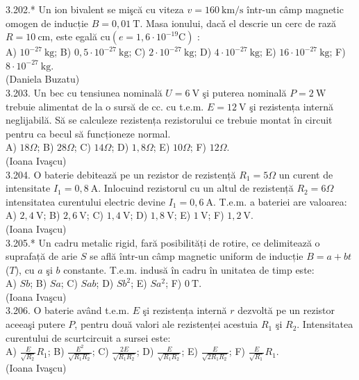 3.202.* Un ion bivalent se mişcă cu viteza $v=160 \mathrm{~km} / \mathrm{s}$ într-un câmp magnetic omogen de inducție $B=0,01 \mathrm{~T}$. Masa ionului, dacǎ el descrie un cerc de rază $R=10 \mathrm{~cm}$, este egală $\mathrm{cu}\left(e=1,6 \cdot 10^{-19} \mathrm{C}\right)$ :\\ A) $10^{-27} \mathrm{~kg}$; B) $0,5 \cdot 10^{-27} \mathrm{~kg}$; C) $2 \cdot 10^{-27} \mathrm{~kg}$; D) $4 \cdot 10^{-27} \mathrm{~kg}$; E) $16 \cdot 10^{-27} \mathrm{~kg}$; F) $8 \cdot 10^{-27} \mathrm{~kg}$.\\ (Daniela Buzatu)\\

3.203. Un bec cu tensiunea nominală $U=6 \mathrm{~V}$ şi puterea nominală $P=2 \mathrm{~W}$ trebuie alimentat de la o sursă de cc. cu t.e.m. $E=12 \mathrm{~V}$ şi rezistența internă neglijabilă. Să se calculeze rezistența rezistorului ce trebuie montat în circuit pentru ca becul să funcționeze normal.\\ A) $18 \Omega$; B) $28 \Omega$; C) $14 \Omega$; D) $1,8 \Omega$; E) $10 \Omega$; F) $12 \Omega$.\\ (Ioana Ivaşcu)\\

3.204. O baterie debitează pe un rezistor de rezistență $R_{1}=5 \Omega$ un curent de intensitate $I_{1}=0,8 \mathrm{~A}$. Inlocuind rezistorul cu un altul de rezistență $R_{2}=6 \Omega$ intensitatea curentului electric devine $I_{1}=0,6 \mathrm{~A}$. T.e.m. a bateriei are valoarea:\\ A) $2,4 \mathrm{~V}$; B) $2,6 \mathrm{~V}$; C) $1,4 \mathrm{~V}$; D) $1,8 \mathrm{~V}$; E) $1 \mathrm{~V}$; F) $1,2 \mathrm{~V}$.\\ (Ioana Ivaşcu)\\

3.205.* Un cadru metalic rigid, fară posibilități de rotire, ce delimitează o suprafață de arie $S$ se află într-un câmp magnetic uniform de inducție $B=a+b t$ ($T$), cu $a$ şi $b$ constante. T.e.m. indusă în cadru în unitatea de timp este:\\ A) $S b$; B) $S a$; C) $S a b$; D) $S b^{2}$; E) $S a^{2}$; F) $0 \mathrm{~T}$.\\ (Ioana Ivaşcu)\\

3.206. O baterie având t.e.m. $E$ şi rezistența internă $r$ dezvoltă pe un rezistor aceeaşi putere $P$, pentru două valori ale rezistenței acestuia $R_{1}$ şi $R_{2}$. Intensitatea curentului de scurtcircuit a sursei este:\\ A) $\frac{E}{\sqrt{R_{2}}} R_{1}$; B) $\frac{E^{2}}{\sqrt{R_{1} R_{2}}}$; C) $\frac{2 E}{\sqrt{R_{1} R_{2}}}$; D) $\frac{E}{\sqrt{R_{1} R_{2}}}$; E) $\frac{E}{\sqrt{2 R_{1} R_{2}}}$; F) $\frac{E}{\sqrt{R_{1}}} R_{1}$.\\ (Ioana Ivaşcu)\\

